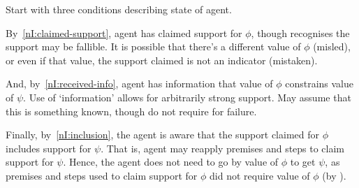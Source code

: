 \begin{note}
  Start with three conditions describing state of agent.

  By~\ref{nI:claimed-support}, agent has claimed support for \(\phi\), though recognises the support may be fallible.
  It is possible that there's a different value of \(\phi\) (misled), or even if that value, the support claimed is not an indicator (mistaken).

  And, by~\ref{nI:received-info}, agent has information that value of \(\phi\) constrains value of \(\psi\).
  Use of `information' allows for arbitrarily strong support.
  May assume that this is something known, though do not require for failure.

  Finally, by~\ref{nI:inclusion}, the agent is aware that the support claimed for \(\phi\) includes support for \(\psi\).
  That is, agent may reapply premises and steps to claim support for \(\psi\).
  Hence, the agent does not need to go by value of \(\phi\) to get \(\psi\), as premises and steps used to claim support for \(\phi\) did not require value of \(\phi\) (by \eiS{}).
\end{note}


